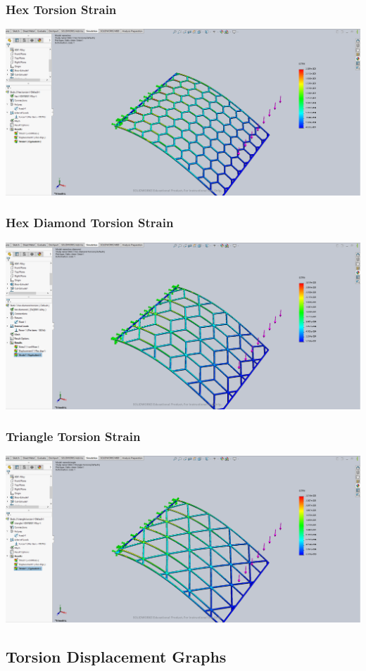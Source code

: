 \documentclass[12pt, letterpaper]{article}
\begin{document}
\begin{singlespace}
\subsubsection{Hex Torsion Strain}
\label{ap:h-to-es}
\includegraphics[width=0.8\linewidth]{./graphs/torsion/hex-torsion-strain}

\subsubsection{Hex Diamond Torsion Strain}
\label{ap:hd-to-es}
\includegraphics[width=0.8\linewidth]{./graphs/torsion/hex-diamond-torsion-strain}

\subsubsection{Triangle Torsion Strain}
\label{ap:t-to-es}
\includegraphics[width=0.8\linewidth]{./graphs/torsion/triangle-torsion-strain}


\subsection{Torsion Displacement Graphs}
\label{ap:to-d}


\end{singlespace}
\end{document}
